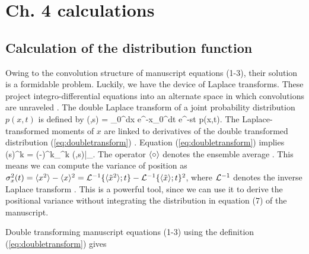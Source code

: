 

\chapter{Ch. 4 calculations}


\section{Calculation of the distribution function}
\label{sec:appendixA}

Owing to the convolution structure  of manuscript equations (1-3), their solution is a formidable problem.
Luckily, we have the device of Laplace transforms.
These project integro-differential equations into an alternate space in which convolutions are unraveled \citep[e.g.,][]{Arfken1985}.
The double Laplace transform of a joint probability distribution $p(x,t)$ is defined by 
\be {}(\eta,s) = \int_0^\infty dx e^{-\eta x}\int_0^\infty dt e^{-st} p(x,t). \label{eq:doubletransform}\ee
The Laplace-transformed moments of $x$ are linked to derivatives of the double transformed distribution (\ref{eq:doubletransform}) \citep[cf.,][]{Berezhkovskii2002}.
Equation (\ref{eq:doubletransform}) implies
\be \bra {}(s)^k \ket = (-)^k\partial_\eta^k (\eta,s)\Big|_{}.\label{eq:momenttrick}\ee
The operator $\langle \circ \rangle$ denotes the ensemble average \citep[e.g.,][]{Kittel1958}.
This means we can compute the variance of position as $\sigma_x^2(t) = \langle x^2 \rangle - \langle x \rangle^2 = \mathcal{L}^{-1} \{\langle\tilde{x}^2 \rangle;t\} - \mathcal{L}^{-1} \{\langle\tilde{x} \rangle;t\}^2$, where $\mathcal{L}^{-1}$ denotes the inverse Laplace transform \citep[e.g.,][]{Arfken1985}. This is a powerful tool, since we can use it to derive the positional variance without integrating the distribution in equation (7) of the manuscript.

Double transforming manuscript equations (1-3) using the definition (\ref{eq:doubletransform}) gives

